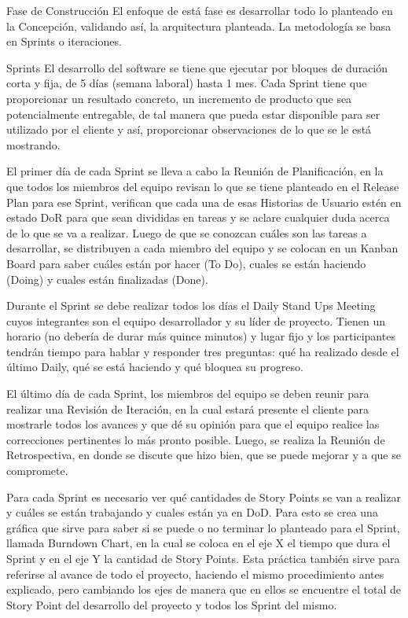 Fase de Construcción
El enfoque de está fase es desarrollar todo lo planteado en la Concepción, validando así, la arquitectura planteada. La metodología se basa en Sprints o iteraciones.

Sprints
El desarrollo del software se tiene que ejecutar por bloques de duración corta y fija, de 5 días (semana laboral) hasta 1 mes. Cada Sprint tiene que proporcionar un resultado concreto, un incremento de producto que sea potencialmente entregable, de tal manera que pueda estar disponible para ser utilizado por el cliente y así, proporcionar observaciones de lo que se le está mostrando.

El primer día de cada Sprint se lleva a cabo la Reunión de Planificación, en la que todos los miembros del equipo revisan lo que se tiene planteado en el Release Plan para ese Sprint, verifican que cada una de esas Historias de Usuario estén en estado DoR para que sean divididas en tareas y se aclare cualquier duda acerca de lo que se va a realizar. Luego de que se conozcan cuáles son las tareas a desarrollar, se distribuyen a cada miembro del equipo y se colocan en un Kanban Board para saber cuáles están por hacer (To Do), cuales se están haciendo (Doing) y cuales están finalizadas (Done).

Durante el Sprint se debe realizar todos los días el Daily Stand Ups Meeting cuyos integrantes son el equipo desarrollador y su líder de proyecto. Tienen un horario (no debería de durar más quince minutos) y lugar fijo y los participantes tendrán tiempo para hablar y responder tres preguntas: qué ha realizado desde el último Daily, qué se está haciendo y qué bloquea su progreso.

El último día de cada Sprint, los miembros del equipo se deben reunir para realizar una Revisión de Iteración, en la cual estará presente el cliente para mostrarle todos los avances y que dé su opinión para que el equipo realice las correcciones pertinentes lo más pronto posible. Luego, se realiza la Reunión de Retrospectiva, en donde se discute que hizo bien, que se puede mejorar y a que se compromete.

Para cada Sprint es necesario ver qué cantidades de Story Points se van a realizar y cuáles se están trabajando y cuales están ya en DoD. Para esto se crea una gráfica que sirve para saber si se puede o no terminar lo planteado para el Sprint, llamada Burndown Chart, en la cual se coloca en el eje X el tiempo que dura el Sprint y en el eje Y la cantidad de Story Points. Esta práctica también sirve para referirse al avance de todo el proyecto, haciendo el mismo procedimiento antes explicado, pero cambiando los ejes de manera que en ellos se encuentre el total de Story Point del desarrollo del proyecto y todos los Sprint del mismo.

